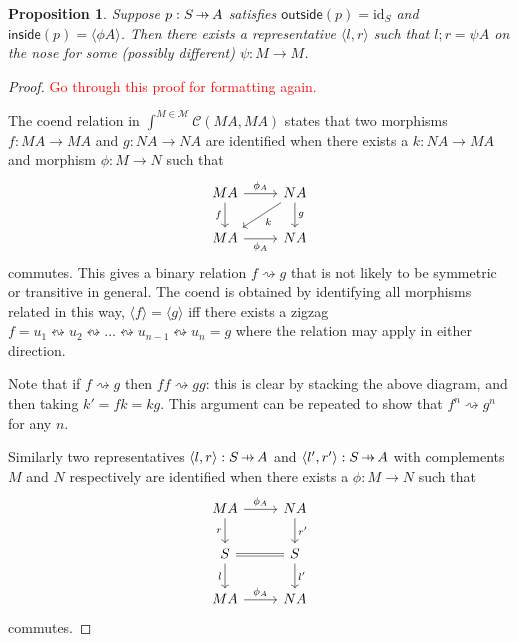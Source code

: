 \documentclass[11pt,a4paper]{article}
\theoremstyle{plain}
\newtheorem{proposition}[theorem]{Proposition}
\theoremstyle{definition}
\newcommand{\C}{\mathscr{C}}
\newcommand{\M}{\mathscr{M}}
\newcommand{\id}{\mathrm{id}}
\newcommand{\inside}{\mathsf{inside}}
\newcommand{\outside}{\mathsf{outside}}
\newcommand{\hto}{\ensuremath{\,\mathaccent\shortmid\rightarrow\,}}
\newcommand{\todo}[1]{\textcolor{red}{\small #1}}
\begin{document}
\begin{proposition}\label{prop-onthenose}
  Suppose $p : S \hto A$ satisfies $\outside(p) = \id_S$ and $\inside(p) = \langle \phi A \rangle$. Then there exists a representative $\langle l, r \rangle$ such that $l ; r = \psi A$ on the nose for some (possibly different) $\psi : M \to M$.
\end{proposition}
\begin{proof}
  \todo{Go through this proof for formatting again.}

  The coend relation in $\int^{M \in \M} \C(M A, M A)$ states that two morphisms $f : M A \to M A$ and $g : N A \to N A$ are identified when there exists a $k : N A \to M A$ and morphism $\phi : M \to N$ such that
  \[
    \begin{tikzcd}
      M A \ar[r, "\phi_A"] \ar[d, "f", swap] & N A \ar[d, "g"] \ar[dl, "k"] \\
      M A \ar[r, "\phi_A", swap] & N A
    \end{tikzcd}
  \]
  commutes. This gives a binary relation $f \rightsquigarrow g$ that is not likely to be symmetric or transitive in general. The coend is obtained by identifying all morphisms related in this way, $\langle f \rangle = \langle g \rangle$ iff there exists a zigzag $f = u_1 \leftrightsquigarrow u_2 \leftrightsquigarrow \dots  \leftrightsquigarrow u_{n-1} \leftrightsquigarrow u_n = g$ where the relation may apply in either direction.

  Note that if $f \rightsquigarrow g$ then $ff \rightsquigarrow gg$: this is clear by stacking the above diagram, and then taking $k' = fk = kg$. This argument can be repeated to show that $f^n \rightsquigarrow g^n$ for any $n$.

  Similarly two representatives $\langle l, r \rangle : S \hto A$ and $\langle l', r' \rangle : S \hto A$ with complements $M$ and $N$ respectively are identified when there exists a $\phi : M \to N$ such that
  \[
    \begin{tikzcd}
      M A \ar[r, "\phi_A"] \ar[d, "r", swap] & N A \ar[d, "r'"] \\
      S \ar[r, equal] \ar[d, "l", swap] & S \ar[d, "l'"]  \\
      MA \ar[r, "\phi_A"] & N A
    \end{tikzcd}
  \]
  commutes.


\end{proof}
\end{document}

